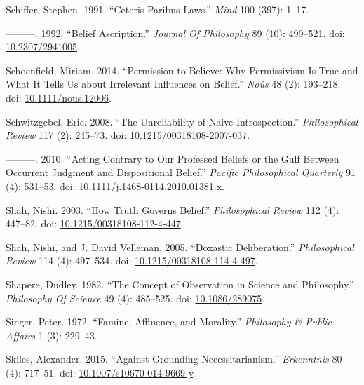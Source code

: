 \documentclass[
  10pt,
  letterpaper,
  DIV=11,
  numbers=noendperiod,
  twoside]{scrartcl}
\newlength{\cslhangindent}
\newenvironment{CSLReferences}[2] %
 {\begin{list}{}{%
  \setlength{\itemindent}{0pt}
  \setlength{\leftmargin}{0pt}
  \setlength{\parsep}{0pt}
  \ifodd #1
   \setlength{\leftmargin}{\cslhangindent}
   \setlength{\itemindent}{-1\cslhangindent}
  \fi
  \setlength{\itemsep}{#2\baselineskip}}}
 {\end{list}}
\begin{document}
\begin{CSLReferences}{1}{0}
Schiffer, Stephen. 1991. {``Ceteris Paribus Laws.''} \emph{Mind} 100
(397): 1--17.

---------. 1992. {``Belief Ascription.''} \emph{Journal Of Philosophy}
89 (10): 499--521. doi:
\href{https://doi.org/10.2307/2941005}{10.2307/2941005}.

Schoenfield, Miriam. 2014. {``Permission to Believe: Why Permissivism Is
True and What It Tells Us about Irrelevant Influences on Belief.''}
\emph{Noûs} 48 (2): 193--218. doi:
\href{https://doi.org/10.1111/nous.12006}{10.1111/nous.12006}.

Schwitzgebel, Eric. 2008. {``The Unreliability of Naive
Introspection.''} \emph{Philosophical Review} 117 (2): 245--73. doi:
\href{https://doi.org/10.1215/00318108-2007-037}{10.1215/00318108-2007-037}.

---------. 2010. {``Acting Contrary to Our Professed Beliefs or the Gulf
Between Occurrent Judgment and Dispositional Belief.''} \emph{Pacific
Philosophical Quarterly} 91 (4): 531--53. doi:
\href{https://doi.org/10.1111/j.1468-0114.2010.01381.x}{10.1111/j.1468-0114.2010.01381.x}.

Shah, Nishi. 2003. {``How Truth Governs Belief.''} \emph{Philosophical
Review} 112 (4): 447--82. doi:
\href{https://doi.org/10.1215/00318108-112-4-447}{10.1215/00318108-112-4-447}.

Shah, Nishi, and J. David Velleman. 2005. {``Doxastic Deliberation.''}
\emph{Philosophical Review} 114 (4): 497--534. doi:
\href{https://doi.org/10.1215/00318108-114-4-497}{10.1215/00318108-114-4-497}.

Shapere, Dudley. 1982. {``The Concept of Observation in Science and
Philosophy.''} \emph{Philosophy Of Science} 49 (4): 485--525. doi:
\href{https://doi.org/10.1086/289075}{10.1086/289075}.

Singer, Peter. 1972. {``Famine, Affluence, and Morality.''}
\emph{Philosophy \& Public Affairs} 1 (3): 229--43.

Skiles, Alexander. 2015. {``Against Grounding Necessitarianism.''}
\emph{Erkenntnis} 80 (4): 717--51. doi:
\href{https://doi.org/10.1007/s10670-014-9669-y}{10.1007/s10670-014-9669-y}.


\end{CSLReferences}
\end{document}
